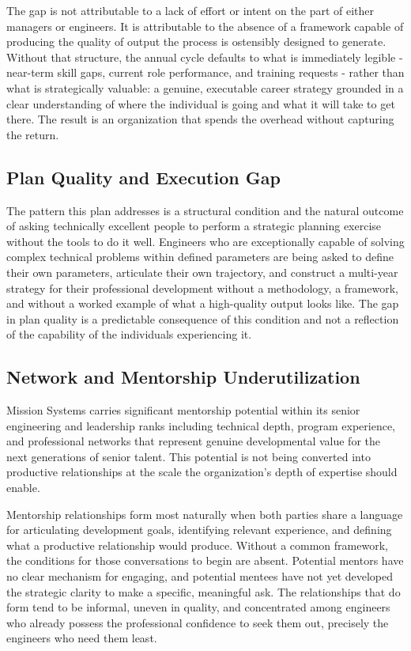 \documentclass{article}
\begin{document}
The gap is not attributable to a lack of effort or intent on the part of either
managers or engineers. It is attributable to the absence of a framework capable
of producing the quality of output the process is ostensibly designed to
generate. Without that structure, the annual cycle defaults to what is
immediately legible - near-term skill gaps, current role performance, and
training requests - rather than what is strategically valuable: a genuine,
executable career strategy grounded in a clear understanding of where the
individual is going and what it will take to get there. The result is an
organization that spends the overhead without capturing the return.

\subsection{Plan Quality and Execution Gap}

The pattern this plan addresses is a structural condition and the natural outcome 
of asking technically excellent people to perform a strategic planning exercise 
without the tools to do it well. Engineers who are exceptionally capable of 
solving complex technical problems within defined parameters are being asked to define their own
parameters, articulate their own trajectory, and construct a multi-year strategy
for their professional development without a methodology, a
framework, and without a worked example of what a high-quality output looks
like. The gap in plan quality is a predictable consequence of this condition and
not a reflection of the capability of the individuals experiencing it.

\subsection{Network and Mentorship Underutilization}

Mission Systems carries significant mentorship potential within its senior
engineering and leadership ranks including technical depth, program experience,
and professional networks that represent genuine developmental value for the next generations of
senior talent. This potential is not being converted into productive
relationships at the scale the organization's depth of expertise should enable.

Mentorship relationships form most naturally when both parties share a language for articulating
development goals, identifying relevant experience, and defining what a
productive relationship would produce. Without a common framework, the
conditions for those conversations to begin are absent. Potential mentors have
no clear mechanism for engaging, and potential mentees have not yet developed
the strategic clarity to make a specific, meaningful ask. The relationships that
do form tend to be informal, uneven in quality, and concentrated among engineers
who already possess the professional confidence to seek them out, precisely
the engineers who need them least.
\end{document}
